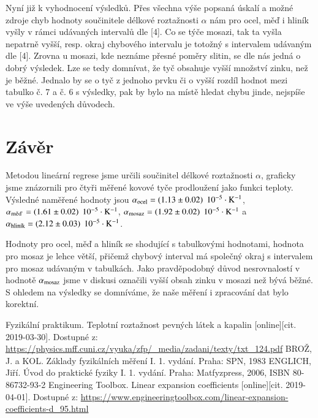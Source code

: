 \documentclass{article}
\begin{document}
\par Nyní již k vyhodnocení výsledků. Přes všechna výše popsaná úskalí a možné zdroje chyb hodnoty součinitele délkové roztažnosti $\alpha$ nám pro ocel, měď i hliník vyšly v rámci udávaných intervalů dle [4]. Co se týče mosazi, tak ta vyšla nepatrně vyšší, resp. okraj chybového intervalu je totožný s intervalem udávaným dle [4]. Zrovna u mosazi, kde neznáme přesné poměry slitin, se dle nás jedná o dobrý výsledek. Lze se tedy domnívat, že tyč obsahuje vyšší množství zinku, než je běžné. Jednalo by se o tyč z jednoho prvku či o vyšší rozdíl hodnot mezi tabulko č. 7 a č. 6 s výsledky, pak by bylo na místě hledat chybu jinde, nejspíše ve výše uvedených důvodech. 
\section*{Závěr}
\par Metodou lineární regrese jsme určili součinitel délkové roztažnosti $\alpha$, graficky jsme znázornili pro čtyři měřené kovové tyče prodloužení jako funkci teploty.
Výsledné naměřené hodnoty jsou $\alpha_\textnormal{ocel} = (1.13\pm0.02)\:\:\mathrm{10^{-5} \cdot K^{-1}}$,
$\alpha_\textnormal{měď} = (1.61\pm0.02)\:\: \mathrm{10^{-5} \cdot K^{-1}}$, $\alpha_\textnormal{mosaz} = (1.92\pm0.02)\:\: \mathrm{10^{-5} \cdot K^{-1}}$ a $\alpha_\textnormal{hliník} = (2.12\pm0.03)\:\: \mathrm{10^{-5} \cdot K^{-1}}$.
\par Hodnoty pro ocel, měď a hliník se shodující s tabulkovými hodnotami, hodnota pro mosaz je lehce větší, přičemž chybový interval má společný okraj s intervalem pro mosaz udávaným v tabulkách. Jako pravděpodobný důvod nesrovnalostí v hodnotě $\alpha_\textnormal{mosaz}$ jsme v diskusi označili vyšší obsah zinku v mosazi než bývá běžné. S ohledem na výsledky se domníváme, že naše měření i zpracování dat bylo korektní.

\renewcommand\refname{Použitá literatura}
\begin{thebibliography}{}
Fyzikální praktikum. Teplotní roztažnost pevných látek a kapalin [online][cit. 2019-03-30]. Dostupné z:
\url{https://physics.mff.cuni.cz/vyuka/zfp/_media/zadani/texty/txt_124.pdf}
BROŽ, J. a KOL. Základy fyzikálních měření I. 1. vydání. Praha: SPN, 1983
ENGLICH, Jiří. Úvod do praktické fyziky I. 1. vydání. Praha: Matfyzpress, 2006, ISBN 80-86732-93-2
Engineering Toolbox. Linear expansion coefficients [online][cit. 2019-04-01]. Dostupné z:
\url{https://www.engineeringtoolbox.com/linear-expansion-coefficients-d_95.html}
\end{thebibliography}
\end{document}
